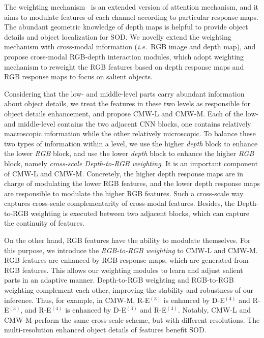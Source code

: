 \documentclass[runningheads]{llncs}
\newcommand{\ie}{\emph{i.e.}}
\begin{document}
The weighting mechanism~\cite{2018Weighting} is an extended version
of attention mechanism, and it aims to modulate features of each channel
according to particular response maps.
The abundant geometric knowledge of depth maps is helpful to provide
object details and object localization for SOD.
We novelly extend the weighting mechanism with cross-modal information
(\ie~RGB image and depth map), and propose cross-modal RGB-depth interaction modules,
which adopt weighting mechanism to reweight the RGB features
based on depth response maps and RGB response maps to focus
on salient objects.


Considering that the low- and middle-level parts carry abundant information about object details, we treat the features in these two levels as responsible for object details enhancement, and propose CMW-L and CMW-M.
Each of the low- and middle-level contains the two adjacent CNN blocks, one contains relatively macroscopic information while the other relatively microscopic.
To balance these two types of information within a level, we use the higher \textit{depth} block to enhance the lower \textit{RGB} block, and use the lower \textit{depth} block to enhance the higher \textit{RGB} block, namely \textit{cross-scale Depth-to-RGB weighting}.
It is an important component of CMW-L and CMW-M.
Concretely, the higher depth response maps are in charge of modulating the lower RGB features,
and the lower depth response maps are responsible to modulate the higher RGB features.
Such a cross-scale way captures cross-scale complementarity of cross-modal features.
Besides, the Depth-to-RGB weighting is executed between two adjacent blocks, which can
capture the continuity of features.


On the other hand, RGB features have the ability to modulate themselves.
For this purpose, we introduce the \textit{RGB-to-RGB weighting} to CMW-L and CMW-M.
RGB features are enhanced by RGB response maps, which are generated from RGB features.
This allows our weighting modules to learn and adjust salient parts in an adaptive manner.
Depth-to-RGB weighting and RGB-to-RGB weighting complement each other, improving the stability and robustness of our inference.
Thus, for example, in CMW-M,
R-E$^{(3)}$ is enhanced by D-E$^{(4)}$ and R-E$^{(3)}$, and
R-E$^{(4)}$ is enhanced by D-E$^{(3)}$ and R-E$^{(4)}$.
Notably, CMW-L and CMW-M perform the same cross-scale scheme, but with different resolutions.
The multi-resolution enhanced object details of features benefit SOD.
\end{document}
